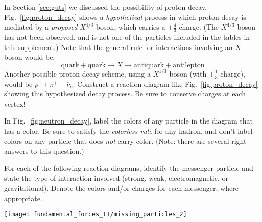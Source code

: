 \begin{problem}
In Section \ref{sec:guts} we discussed the possibility of proton
decay.  Fig.~\ref{fig:proton_decay} shows a {\em hypothetical} process
in which proton decay is mediated by a {\em proposed} $X^{4/3}$ boson,
which carries a $+\textstyle{\frac{4}{3}}$ charge.  (The $X^{4/3}$ boson 
has not been observed, and is not one of the particles included in the 
tables in this supplement.)  Note that the general rule for
interactions involving an $X$-boson would be:
  $$
  \mbox{quark} +\mbox{quark} \to X \to \mbox{antiquark} +
  \mbox{antilepton}
  $$
Another possible proton decay scheme, using a $X^{1/3}$ boson (with
$+\textstyle{\frac{1}{3}}$ charge), would be $p \to \pi^+ + \overline\nu_e$.  Construct
a reaction diagram like Fig.~\ref{fig:proton_decay} showing this 
hypothesized decay process.  Be sure to conserve charges at each vertex!
\label{prob:X_boson}
\end{problem}

\begin{problem}
In Fig.~\ref{fig:neutron_decay}, label the colors of any
particle in the diagram that has a color.  Be sure to satisfy the
{\em colorless rule} for any hadron, and don't label colors on any
particle that does {\em not} carry color.  (Note: there are several
right answers to this question.)
\label{prob:neutron_decay_reaction_diagram}
\end{problem}

\begin{problem}
For each of the following reaction diagrams, identify the
messenger particle and state the type of interaction involved
(strong, weak, electromagnetic, or gravitational).  Denote the
colors and/or charges for each messenger, where appropriate.
\begin{center}
  \texttt{[image: fundamental\_forces\_II/missing\_particles\_2]}
\end{center}
\label{prob:identify_missing_info}
\end{problem}
\vfill


